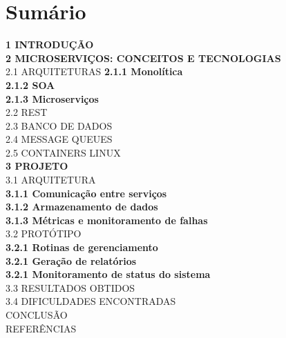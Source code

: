 \section{Sumário}

  \noindent
  \textbf{1 INTRODUÇÃO} \\
  \textbf{2 MICROSERVIÇOS: CONCEITOS E TECNOLOGIAS} \\
  2.1 ARQUITETURAS
  \textbf{2.1.1 Monolítica} \\
  \textbf{2.1.2 SOA} \\
  \textbf{2.1.3 Microserviços} \\
  2.2 REST \\
  2.3 BANCO DE DADOS \\
  2.4 MESSAGE QUEUES \\
  2.5 CONTAINERS LINUX \\
  \textbf{3 PROJETO} \\
  3.1 ARQUITETURA \\
  \textbf{3.1.1 Comunicação entre serviços} \\
  \textbf{3.1.2 Armazenamento de dados} \\
  \textbf{3.1.3 Métricas e monitoramento de falhas} \\
  3.2 PROTÓTIPO \\
  \textbf{3.2.1 Rotinas de gerenciamento} \\
  \textbf{3.2.1 Geração de relatórios} \\
  \textbf{3.2.1 Monitoramento de status do sistema} \\
  3.3 RESULTADOS OBTIDOS \\
  3.4 DIFICULDADES ENCONTRADAS \\
  CONCLUSÃO \\
  REFERÊNCIAS \\
